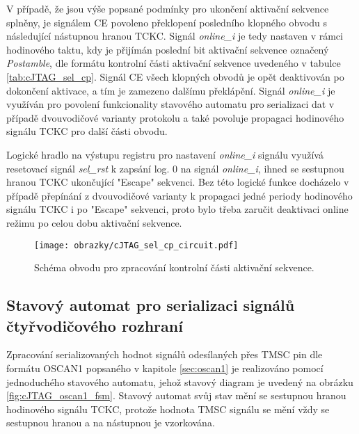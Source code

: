 V případě, že jsou výše popsané podmínky pro ukončení aktivační sekvence splněny, je signálem CE povoleno překlopení posledního klopného obvodu s následující nástupnou hranou \acs{TCKC}. Signál \textit{online\_i} je tedy nastaven v rámci hodinového taktu, kdy je přijímán poslední bit aktivační sekvence označený \textit{Postamble}, dle formátu kontrolní části aktivační sekvence uvedeného v tabulce \ref{tab:cJTAG_sel_cp}. Signál CE všech klopných obvodů je opět deaktivován po dokončení aktivace, a tím je zamezeno dalšímu překlápění. Signál \textit{online\_i} je využíván pro povolení funkcionality stavového automatu pro serializaci dat v případě dvouvodičové varianty protokolu a také povoluje propagaci hodinového signálu \acs{TCKC} pro další části obvodu. 

Logické hradlo na výstupu registru pro nastavení \textit{online\_i} signálu využívá resetovací signál \textit{sel\_rst} k zapsání log. 0 na signál \textit{online\_i}, ihned se sestupnou hranou \acs{TCKC} ukončující "Escape" sekvenci. Bez této logické funkce docházelo v případě přepínání z dvouvodičové varianty k propagaci jedné periody hodinového signálu \acs{TCKC} i po "Escape" sekvenci, proto bylo třeba zaručit deaktivaci online režimu po celou dobu aktivační sekvence.

\begin{figure}[H]
  \begin{center}
    \texttt{[image: obrazky/cJTAG\_sel\_cp\_circuit.pdf]}
  \end{center}
  \caption{Schéma obvodu pro zpracování kontrolní části aktivační sekvence.}
	\label{fig:cJTAG_sel_cp_circuit}
\end{figure}

\subsection{Stavový automat pro serializaci signálů čtyřvodičového rozhraní}	\label{subsec:oscan1_fsm}
Zpracování serializovaných hodnot signálů odesílaných přes \acs{TMSC} pin dle formátu OSCAN1 popsaného v kapitole \ref{sec:oscan1} je realizováno pomocí jednoduchého stavového automatu, jehož stavový diagram je uvedený na obrázku \ref{fig:cJTAG_oscan1_fsm}. Stavový automat svůj stav mění se sestupnou hranou hodinového signálu \acs{TCKC}, protože hodnota \acs{TMSC} signálu se mění vždy se sestupnou hranou a na nástupnou je vzorkována.

